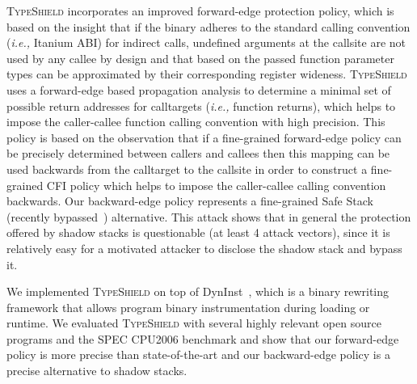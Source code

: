 \textsc{TypeShield} incorporates an improved forward-edge protection policy, which is
based on the insight that if the binary adheres to the standard calling convention (\textit{i.e.,} Itanium ABI)
for indirect calls, undefined arguments at the callsite are not used by any callee by design and that based
on the passed function parameter types can be approximated by their corresponding register wideness.
\textsc{TypeShield} uses a forward-edge based propagation analysis to determine a minimal
set of possible return addresses for calltargets (\textit{i.e.,} function returns), which helps to impose the caller-callee 
function calling convention with high precision. This policy is based on the observation that if a fine-grained 
forward-edge policy can be precisely determined between callers and callees then this mapping can be used backwards 
from the calltarget to the callsite in order to construct a fine-grained CFI policy which helps to impose the caller-callee calling convention backwards.
Our backward-edge policy represents a fine-grained Safe Stack~\cite{volodymyr:cpi} (recently bypassed~\cite{safestack:bypassing}) alternative.
This attack shows that in general the protection offered by shadow stacks is questionable (at least 4 attack vectors), since it is relatively 
easy for a motivated attacker to disclose the shadow stack and bypass it.

We implemented \textsc{TypeShield} on top of DynInst~\cite{bernat:dyninst}, which is
a binary rewriting framework that allows program binary instrumentation during loading or runtime.
We evaluated \textsc{TypeShield} with several highly relevant open source programs and the SPEC CPU2006 benchmark
and show that our forward-edge policy is more precise than state-of-the-art and our backward-edge policy is a precise 
alternative to shadow stacks. 


